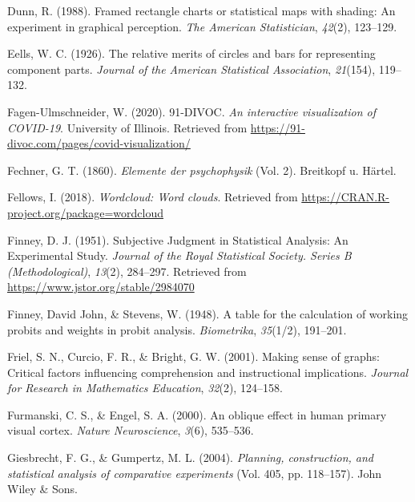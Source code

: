 \documentclass[print]{nuthesis}
\newlength{\cslhangindent}
\newenvironment{CSLReferences}%
{\setlength{\parindent}{0pt}%
\everypar{\setlength{\hangindent}{\cslhangindent}}\ignorespaces}%
{\par}
\begin{document}
\begin{CSLReferences}{1}{0}
\leavevmode{}%
Dunn, R. (1988). Framed rectangle charts or statistical maps with shading: An experiment in graphical perception. \emph{The American Statistician}, \emph{42}(2), 123--129.

\leavevmode{}%
Eells, W. C. (1926). The relative merits of circles and bars for representing component parts. \emph{Journal of the American Statistical Association}, \emph{21}(154), 119--132.

\leavevmode{}%
Fagen-Ulmschneider, W. (2020). 91-DIVOC. \emph{An interactive visualization of COVID-19}. University of Illinois. Retrieved from \url{https://91-divoc.com/pages/covid-visualization/}

\leavevmode{}%
Fechner, G. T. (1860). \emph{Elemente der psychophysik} (Vol. 2). Breitkopf u. H{ä}rtel.

\leavevmode{}%
Fellows, I. (2018). \emph{Wordcloud: Word clouds}. Retrieved from \url{https://CRAN.R-project.org/package=wordcloud}

\leavevmode{}%
Finney, D. J. (1951). Subjective {Judgment} in {Statistical} {Analysis}: {An} {Experimental} {Study}. \emph{Journal of the Royal Statistical Society. Series B (Methodological)}, \emph{13}(2), 284--297. Retrieved from \url{https://www.jstor.org/stable/2984070}

\leavevmode{}%
Finney, David John, \& Stevens, W. (1948). A table for the calculation of working probits and weights in probit analysis. \emph{Biometrika}, \emph{35}(1/2), 191--201.

\leavevmode{}%
Friel, S. N., Curcio, F. R., \& Bright, G. W. (2001). Making sense of graphs: Critical factors influencing comprehension and instructional implications. \emph{Journal for Research in Mathematics Education}, \emph{32}(2), 124--158.

\leavevmode{}%
Furmanski, C. S., \& Engel, S. A. (2000). An oblique effect in human primary visual cortex. \emph{Nature Neuroscience}, \emph{3}(6), 535--536.

\leavevmode{}%
Giesbrecht, F. G., \& Gumpertz, M. L. (2004). \emph{Planning, construction, and statistical analysis of comparative experiments} (Vol. 405, pp. 118--157). John Wiley \& Sons.


\end{CSLReferences}
\end{document}
